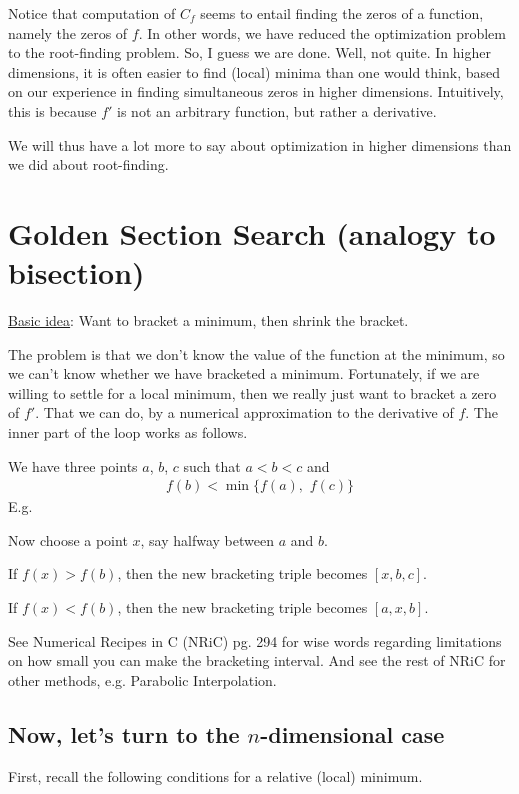 Notice that computation of $C_f$ seems to entail finding the zeros of a function, namely the zeros of $f$.
In other words, we have reduced the optimization problem to the root-finding problem.
So, I guess we are done.
Well, not quite.
In higher dimensions, it is often easier to find (local) minima than one would think, based on our experience in finding simultaneous zeros in higher dimensions.
Intuitively, this is because $f'$ is not an arbitrary function, but rather a derivative.

We will thus have a lot more to say about optimization in higher dimensions than we did about root-finding.

\section{Golden Section Search (analogy to bisection)}

\underline{Basic idea}: Want to bracket a minimum, then shrink the bracket.

The problem is that we don't know the value of the function at the minimum, so we can't know whether we have bracketed a minimum.
Fortunately, if we are willing to settle for a local minimum, then we really just want to bracket a zero of $f'$.
That we can do, by a numerical approximation to the derivative of $f$.
The inner part of the loop works as follows.

We have three points $a$, $b$, $c$ such that $a < b < c$ and
\begin{align}
  f(b) < \min \{ f(a),\,\,f(c)\}
\end{align}
E.g.

Now choose a point $x$, say halfway between $a$ and $b$.

If $f(x) > f(b)$, then the new bracketing triple becomes $[x, b, c]$.

If $f(x) < f(b)$, then the new bracketing triple becomes $[a, x, b]$.

See Numerical Recipes in C (NRiC) pg. 294 for wise words regarding limitations on how small you can make the bracketing interval.
And see the rest of NRiC for other methods, e.g. Parabolic Interpolation.

\subsection{Now, let's turn to the $n$-dimensional case}

First, recall the following conditions for a relative (local) minimum.

